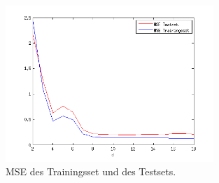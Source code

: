\begin{figure}[hp!]
\begin{center}
 \includegraphics[width=0.7\textwidth]{./figures/RBF_MSE}
 \caption[MSE]{MSE des Trainingsset und des Testsets.}
\label{fig:RBF_MSE}
\end{center}
\end{figure}
\clearpage